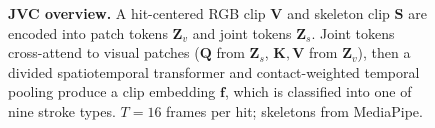 \begin{figure}[t]
  \centering
  \resizebox{\linewidth}{!}{%
  }
  \caption{\textbf{JVC overview.}
    A hit-centered RGB clip $\mathbf{V}$ and skeleton clip $\mathbf{S}$ are encoded into
    patch tokens $\mathbf{Z}_v$ and joint tokens $\mathbf{Z}_s$.
    Joint tokens cross-attend to visual patches ($\mathbf{Q}$ from $\mathbf{Z}_s$,
    $\mathbf{K},\mathbf{V}$ from $\mathbf{Z}_v$), then a divided spatiotemporal
    transformer and contact-weighted temporal pooling produce a clip embedding
    $\mathbf{f}$, which is classified into one of nine stroke types.
    $T{=}16$ frames per hit; skeletons from MediaPipe.}
  \label{fig:jvc}
\end{figure}
